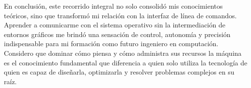 \documentclass[12pt]{article}
\begin{document}
En conclusión, este recorrido integral no solo consolidó mis conocimientos teóricos, sino que transformó mi relación con la interfaz de línea de comandos. Aprender a comunicarme con el sistema operativo sin la intermediación de entornos gráficos me brindó una sensación de control, autonomía y precisión indispensable para mi formación como futuro ingeniero en computación. Considero que dominar cómo piensa y cómo administra sus recursos la máquina es el conocimiento fundamental que diferencia a quien solo utiliza la tecnología de quien es capaz de diseñarla, optimizarla y resolver problemas complejos en su raíz.

\nocite{*}
\printbibliography[heading=bibintoc, title={Referencias}]
\end{document}
